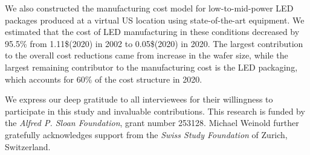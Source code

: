 \documentclass[a4paper,nocompress]{spie}  %
\begin{document}
    We also constructed the manufacturing cost model for low-to-mid-power LED packages produced at a virtual US location using state-of-the-art equipment. We estimated that the cost of LED manufacturing in these conditions decreased by 95.5\% from 1.11\$(2020) in 2002 to 0.05\$(2020) in 2020. The largest contribution to the overall cost reductions came from increase in the wafer size, while the largest remaining contributor to the manufacturing cost is the LED packaging, which accounts for 60\% of the cost structure in 2020.

\acknowledgments %

We express our deep gratitude to all interviewees for their willingness to participate in this study and invaluable contributions. This research is funded by the \textit{Alfred P. Sloan Foundation}, grant number 253128. Michael Weinold further gratefully acknowledges support from the \textit{Swiss Study Foundation} of Zurich, Switzerland.

\clearpage
\end{document}

